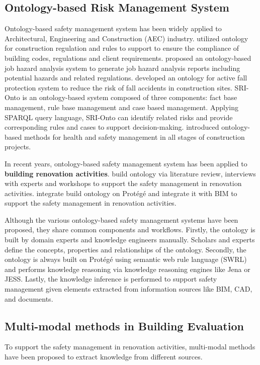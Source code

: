 \subsection*{Ontology-based Risk Management System}
Ontology-based safety management system has been widely applied to Architectural, Engineering and Construction (AEC) industry.
\cite{zhong2015ontological} utilized ontology for construction regulation and rules to support to ensure the compliance of building codes, regulations and client requirements. \cite{zhang2015ontology,wang2011ontology} proposed an ontology-based job hazard analysis system to generate job hazard analysis reports including potential hazards and related regulations. 
\cite{guo2017ontology} developed an ontology for active fall protection system to reduce the risk of fall accidents in construction sites. 
SRI-Onto \cite[]{xing2019ontology} is an ontology-based system composed of three components: fact base management, rule base management and case based management. Applying SPARQL query language, 
SRI-Onto can identify related risks and provide corresponding rules and cases to support decision-making. 
\cite{gao2022knowledge} introduced ontology-based methods for health and safety management in all stages of construction projects. 

In recent years, ontology-based safety management system has been applied to \textbf{building renovation activities}. 
\cite{amorocho2021reno} build ontology via literature review, interviews with experts and workshops to support the safety management in renovation activities. 
\cite{doukari2024ontology} integrate build ontology on Protégé and integrate it with BIM to support the safety management in renovation activities. 

Although the various ontology-based safety management systems have been proposed, they share common components and workflows.
Firstly, the ontology is built by domain experts and knowledge engineers manually. Scholars and experts define the concepts, properties and relationships of the ontology.
Secondly, the ontology is always built on Protégé using semantic web rule language (SWRL) and performs knowledge reasoning via knowledge reasoning engines like Jena or JESS.   
Lastly, the knowledge inference is performed to support safety management given elements extracted from information sources like BIM, CAD, and documents.  

\subsection*{Multi-modal methods in Building Evaluation}
To support the safety management in renovation activities, multi-modal methods have been proposed to extract knowledge from different sources.
